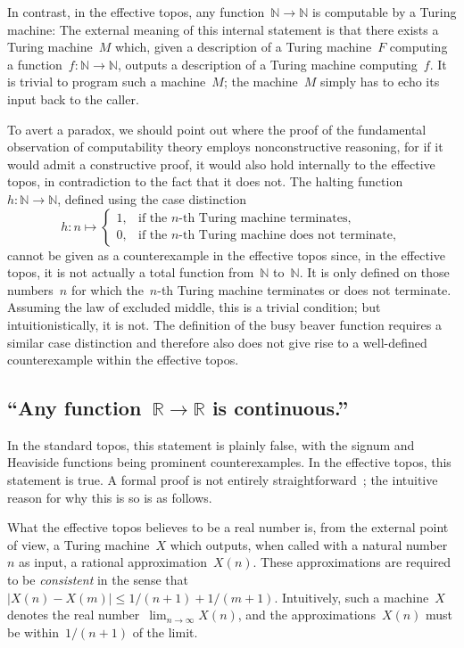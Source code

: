 \documentclass[oneside]{amsart}
\theoremstyle{definition}
\theoremstyle{plain}
\theoremstyle{remark}
\newcommand{\NN}{\mathbb{N}}
\newcommand{\RR}{\mathbb{R}}
\renewcommand{\_}{\mathpunct{.}\,}
\newcommand{\effective}{ef{}fective\xspace}
\newcommand{\?}{\,{:}\,}
\begin{document}
In contrast, in the \effective topos, any function~$\NN \to \NN$ is computable
by a Turing machine: The external meaning of this internal statement is that
there exists a Turing machine~$M$ which, given a description of a Turing
machine~$F$ computing a function~$f : \NN \to \NN$, outputs a description of a
Turing machine computing~$f$. It is trivial to program such a machine~$M$; the
machine~$M$ simply has to echo its input back to the caller.

To avert a paradox, we should point out where the proof of the fundamental
observation of computability theory employs nonconstructive reasoning, for if
it would admit a constructive proof, it would also hold internally to the
\effective topos, in contradiction to the fact that it does not. The halting
function~$h : \NN \to \NN$, defined using the case distinction
\[ h : n \mapsto \begin{cases}
  1, & \text{if the $n$-th Turing machine terminates}, \\
  0, & \text{if the $n$-th Turing machine does not terminate},
\end{cases} \]
cannot be given as a counterexample in the \effective topos since, in the
\effective topos, it is not actually a total function from~$\NN$ to~$\NN$. It
is only defined on those numbers~$n$ for which the~$n$-th Turing machine
terminates or does not terminate. Assuming the law of excluded middle, this is
a trivial condition; but intuitionistically, it is not. The definition of the
busy beaver function requires a similar case distinction and therefore also
does not give rise to a well-defined counterexample within the \effective
topos.


\subsection*{``Any function~$\RR \to \RR$ is continuous.''} In the standard
topos, this statement is plainly false, with the signum and Heaviside functions
being prominent counterexamples. In the \effective topos, this statement is
true. A formal proof is not entirely straightforward~\cite{XXX}; the intuitive
reason for why this is so is as follows.

What the \effective topos believes to be a real number is, from the external
point of view, a Turing machine~$X$ which outputs, when called with a natural
number~$n$ as input, a rational approximation~$X(n)$. These approximations are
required to be \emph{consistent} in the sense that~$|X(n) - X(m)|
\leq 1/(n+1) + 1/(m+1)$. Intuitively, such a machine~$X$ denotes the real
number~$\lim_{n \to \infty} X(n)$, and the approximations~$X(n)$ must be
within~$1/(n+1)$ of the limit.
\end{document}
